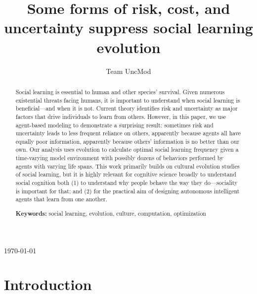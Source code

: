 \documentclass[10pt,letterpaper]{article}
\title{Some forms of risk, cost, and uncertainty suppress social learning evolution}
\author{Team UncMod}
\begin{document}
\maketitle
\today


\begin{abstract}
  Social learning is essential to human and other species' survival. Given numerous
  existential threats facing humans, it is important to understand when social learning
  is beneficial---and when it is not. Current theory identifies risk and uncertainty
  as major factors that drive individuals to learn from others. However, in this paper, 
  we use agent-based modeling to demonstrate a surprising result: 
  sometimes risk and uncertainty leads to less frequent reliance on others,
  apparently because agents all have equally poor information, 
  apparently because others' 
  information is no better than our own.  Our analysis uses evolution to calculate
  optimal social learning frequency given a time-varying model environment with possibly
  dozens of behaviors performed by agents with varying life spans. 
  This work primarily builds on cultural evolution studies of social learning, 
  but it is highly relevant
  for cognitive science broadly to understand social cognition both (1)
  to understand why people behave the way they do---sociality is important for
  that; and (2) for the practical aim of designing autonomous 
  intelligent agents that learn from one another.

\textbf{Keywords:} social learning, evolution, culture, computation, optimization

\end{abstract}


\section{Introduction}
\end{document}
